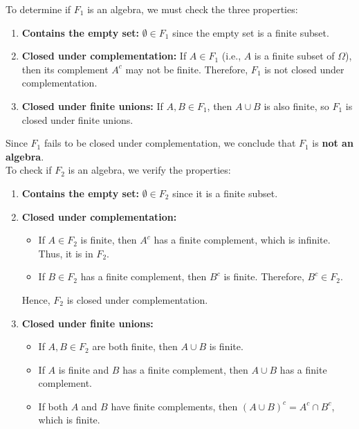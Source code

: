 \begin{solution}

    To determine if \(F_1\) is an algebra, we must check the three properties:

    \begin{enumerate}
        \item \textbf{Contains the empty set:} \(\emptyset \in F_1\) since the empty set is a finite subset.
        
        \item \textbf{Closed under complementation:} If \(A \in F_1\) (i.e., \(A\) is a finite subset of \(\Omega\)), then its complement \(A^c\) may not be finite. Therefore, \(F_1\) is not closed under complementation.
        
        \item \textbf{Closed under finite unions:} If \(A, B \in F_1\), then \(A \cup B\) is also finite, so \(F_1\) is closed under finite unions.
    \end{enumerate}

    Since \(F_1\) fails to be closed under complementation, we conclude that \(F_1\) is \textbf{not an algebra}.\\

To check if \(F_2\) is an algebra, we verify the properties:

\begin{enumerate}
    \item \textbf{Contains the empty set:} \(\emptyset \in F_2\) since it is a finite subset.
    
    \item \textbf{Closed under complementation:}
    \begin{itemize}
        \item If \(A \in F_2\) is finite, then \(A^c\) has a finite complement, which is infinite. Thus, it is in \(F_2\).
        \item If \(B \in F_2\) has a finite complement, then \(B^c\) is finite. Therefore, \(B^c \in F_2\).
    \end{itemize}
    Hence, \(F_2\) is closed under complementation.

    \item \textbf{Closed under finite unions:}
    \begin{itemize}
        \item If \(A, B \in F_2\) are both finite, then \(A \cup B\) is finite.
        \item If \(A\) is finite and \(B\) has a finite complement, then \(A \cup B\) has a finite complement.
        \item If both \(A\) and \(B\) have finite complements, then \((A \cup B)^c = A^c \cap B^c\), which is finite.
    \end{itemize}
\end{enumerate}


\end{solution}
